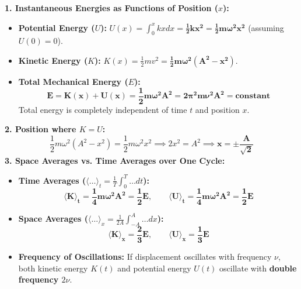 \documentclass[10pt,twoside,openright]{book}
\begin{document}
\begin{formulabox}
\textbf{1. Instantaneous Energies as Functions of Position ($x$):}
\begin{itemize}
  \item \textbf{Potential Energy ($U$):} $U(x) = \int_0^x kx dx = \mathbf{\frac{1}{2} k x^2 = \frac{1}{2} m \omega^2 x^2}$ (assuming $U(0) = 0$).
  \item \textbf{Kinetic Energy ($K$):} $K(x) = \frac{1}{2} m v^2 = \mathbf{\frac{1}{2} m \omega^2 (A^2 - x^2)}$.
  \item \textbf{Total Mechanical Energy ($E$):}
  \begin{equation}
    \mathbf{E = K(x) + U(x) = \frac{1}{2} m \omega^2 A^2 = 2 \pi^2 m \nu^2 A^2 = \text{constant}}
  \end{equation}
  Total energy is completely independent of time $t$ and position $x$.
\end{itemize}
\textbf{2. Position where $K = U$:}
\begin{equation}
  \frac{1}{2}m\omega^2(A^2 - x^2) = \frac{1}{2}m\omega^2 x^2 \implies 2x^2 = A^2 \implies \mathbf{x = \pm \frac{A}{\sqrt{2}}}
\end{equation}
\textbf{3. Space Averages vs. Time Averages over One Cycle:}
\begin{itemize}
  \item \textbf{Time Averages ($\langle \dots \rangle_t = \frac{1}{T}\int_0^T \dots dt$):}
  \begin{equation}
    \mathbf{\langle K \rangle_t = \frac{1}{4} m \omega^2 A^2 = \frac{1}{2}E}, \qquad \mathbf{\langle U \rangle_t = \frac{1}{4} m \omega^2 A^2 = \frac{1}{2}E}
  \end{equation}
  \item \textbf{Space Averages ($\langle \dots \rangle_x = \frac{1}{2A}\int_{-A}^A \dots dx$):}
  \begin{equation}
    \mathbf{\langle K \rangle_x = \frac{2}{3}E}, \qquad \mathbf{\langle U \rangle_x = \frac{1}{3}E}
  \end{equation}
  \item \textbf{Frequency of Oscillations:} If displacement oscillates with frequency $\nu$, both kinetic energy $K(t)$ and potential energy $U(t)$ oscillate with \textbf{double frequency $2\nu$}.
\end{itemize}
\end{formulabox}
\end{document}
